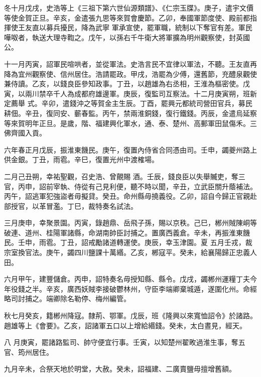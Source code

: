 \begin{pinyinscope}
 冬十月戊戌，史浩等上《三祖下第六世仙源類譜》、《仁宗玉牒》。庚子，遣宇文價等使金賀正旦。辛亥，金遣張九思等來賀會慶節。乙卯，奉國軍節度使、殿前都指揮使王友直以募兵擾民，降為武寧
 軍承宣使，罷軍職，統制以下奪官有差。軍民嘩呶者，執送大理寺鞫之。戊午，以孫右千牛衛大將軍擴為明州觀察使，封英國公。



 十一月丙寅，詔軍民喧哄者，並從軍法。史浩言民不宜律以軍法，不聽。王友直再降為宜州觀察使、信州居住。浩請罷政。甲戌，浩罷為少傅，還舊節，充醴泉觀使兼侍讀。乙亥，以錢良臣參知政事。丁丑，以趙雄為右丞相，王淮為樞密使。戊寅，以兩川禁卒千人為成都府雄邊軍。庚辰，復監司互察法。十二月庚寅朔，班新定薦舉
 式。辛卯，遣錢沖之等賀金主生辰。丁酉，罷興元都統司營田官兵，募民耕佃。辛丑，復同安、蘄春監。丙午，禁兩淮銅錢，復行鐵錢。丙辰，金遣烏延察等來賀明年正旦。是歲，階、福建興化軍水，通、泰、楚州、高郵軍田鼠傷禾。三佛齊國入貢。



 六年春正月戊辰，振淮東饑民。庚午，復置內侍省合同憑由司。壬申，蠲夔州路上供金銀。丁丑，雨雹。辛巳，復置光州中渡榷場。



 二月己丑朔，幸祐聖觀，召史浩、曾覿賜
 酒。壬辰，錢良臣以失舉贓吏，奪三官，丙申，詔前宰執、侍從有己見利便，聽不時以聞，辛丑，立武臣關升蔭補法。丙午，詔逃軍犯強盜者毋擬貸。癸丑。命州縣毋撓義役。乙卯，詔自今歸正官親赴部授官，以革冒濫。丁巳，裁特奏名試法。



 三月庚申，幸聚景園。丙寅，錄趙鼎、岳飛子孫，賜以京秩。己巳，郴州賊陳峒等破連、道州、桂陽軍諸縣，命湖南帥臣討捕之。置廣西義倉。辛未，再振淮東饑民。壬申，雨雹。丁丑，詔戒勵諸道轉運使。庚辰，幸玉津園。夏
 五月壬戎，裁宗室換官法。庚午，蠲四川鹽課十萬緡。乙亥，郴寇平。癸未，給襄陽歸正忠義人田。



 六月甲午，建豐儲倉。丙申，詔特奏名毋授知縣、縣令。戊戌，蠲郴州運糧丁夫今年役錢之半。辛亥，廣西妖賊李接破鬱林州，守臣李端卿棄城遁，遂圍化州。命經略司討捕之。端卿除名勒停、梅州編管。



 秋七月癸亥，籍郴州降寇。隸荊、鄂軍。戊辰，班《隆興以來寬恤詔令》於諸路。趙雄等上《會要》。乙亥，詔諸軍五口以上增給緡錢。癸未，太白晝見，經天。



 八
 月庚寅，罷諸路監司、帥守便宜行事。壬寅，以知楚州翟畋過淮生事，奪五官、筠州居住。



 九月辛未，合祭天地於明堂，大赦。癸未，詔福建、二廣賣鹽毋擅增舊額。




\end{pinyinscope}
